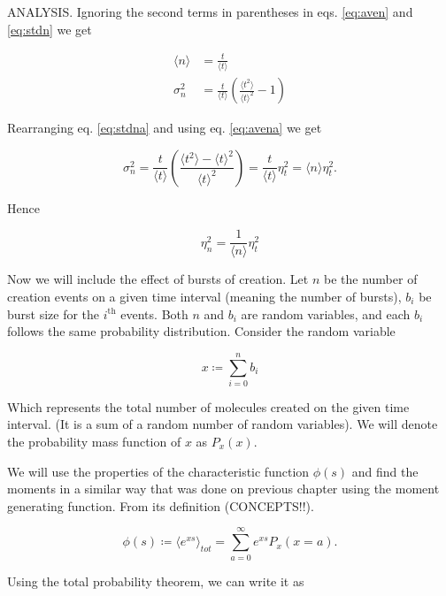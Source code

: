ANALYSIS. Ignoring the second terms in parentheses in eqs. \ref{eq:aven} and \ref{eq:stdn} we get

\begin{align}
  \langle n\rangle &= \frac{t}{\langle t\rangle} \label{eq:avena} \\
  \sigma_n^2 &= \frac{t}{\langle t\rangle}\left(\frac{\langle t^2\rangle}{\langle t\rangle^2}-1\right) \label{eq:stdna}
\end{align}

Rearranging eq. \ref{eq:stdna} and using eq. \ref{eq:avena} we get

\begin{equation*}
  \sigma_n^2 = \frac{t}{\langle t\rangle}\left(\frac{\langle t^2\rangle - \langle t\rangle^2}{\langle t\rangle^2}\right) = \frac{t}{\langle t\rangle}\eta_t^2 = \langle n\rangle\eta_t^2.
\end{equation*}

Hence

\begin{equation}
  \label{eq:noisen1}
  \eta_n^2=\frac{1}{\langle n\rangle}\eta_t^2
\end{equation}

Now we will include the effect of bursts of creation. Let $n$ be the number of creation events on a given time interval (meaning the number of bursts), $b_i$ be burst size for the $i^{\text{th}}$ events. Both $n$ and $b_i$ are random variables, and each $b_i$ follows the same probability distribution. Consider the random variable

\begin{equation}
  \label{eq:xtotal}
  x\coloneqq\sum_{i=0}^nb_i
\end{equation}

Which represents the total number of molecules created on the given time interval. (It is a sum of a random number of random variables). We will denote the probability mass function of $x$ as $P_x(x)$.

We will use the properties of the characteristic function $\phi(s)$ and find the moments in a similar way that was done on previous chapter using the moment generating function. From its definition (CONCEPTS!!).

\begin{equation*}
  \phi(s) \coloneqq \langle e^{xs}\rangle_{tot} = \sum_{a=0}^\infty e^{xs}P_x(x=a).
\end{equation*}

Using the total probability theorem, we can write it as

